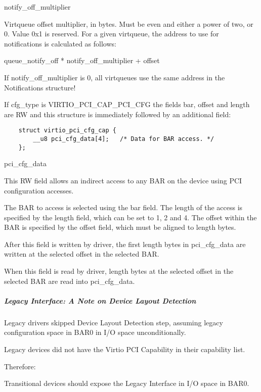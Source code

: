 notify_off_multiplier

        Virtqueue offset multiplier, in bytes. Must be even and either a power of two, or 0.
        Value 0x1 is reserved.
        For a given virtqueue, the address to use for notifications is calculated as follows:

        queue_notify_off * notify_off_multiplier + offset

        If notify_off_multiplier is 0, all virtqueues use the same address in
        the Notifications structure!

If cfg_type is VIRTIO_PCI_CAP_PCI_CFG the fields bar, offset and length are RW
and this structure is immediately followed by an additional field:

\begin{lstlisting}
	struct virtio_pci_cfg_cap {
		__u8 pci_cfg_data[4];	/* Data for BAR access. */
	};
\end{lstlisting}

pci_cfg_data

        This RW field allows an indirect access to any BAR on the
        device using PCI configuration accesses.

        The BAR to access is selected using the bar field.
        The length of the access is specified by the length
        field, which can be set to 1, 2 and 4.
        The offset within the BAR is specified by the offset
        field, which must be aligned to length bytes.

        After this field is written by driver, the first length
        bytes in pci_cfg_data are written at the selected
        offset in the selected BAR.

        When this field is read by driver, length bytes at the
        selected offset in the selected BAR are read into pci_cfg_data.

\subparagraph{Legacy Interface: A Note on Device Layout Detection}\label{sec:Virtio Transport Options / Virtio Over PCI Bus / PCI-specific Initialization And Device Operation / Device Initialization / Virtio Device Configuration Layout Detection / Legacy Interface: A Note on Device Layout Detection}

Legacy drivers skipped  Device Layout Detection step, assuming legacy
configuration space in BAR0 in I/O space unconditionally.

Legacy devices did not have the Virtio PCI Capability in their
capability list.

Therefore:

Transitional devices should expose the Legacy Interface in I/O
space in BAR0.

